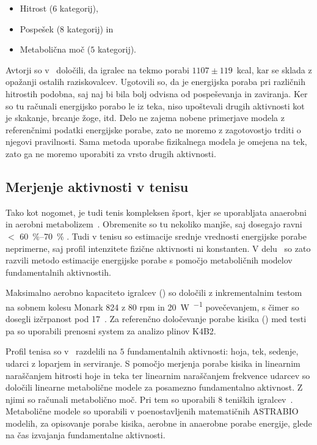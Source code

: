 \begin{itemize}
\item Hitrost ($6$ kategorij),
\item Pospešek ($8$ kategorij) in
\item Metabolična moč ($5$ kategorij).
\end{itemize}

Avtorji so v~\cite{osgnach2010energy} določili, da igralec na tekmo porabi $1107 \pm 119$~kcal, kar se sklada z opažanji ostalih raziskovalcev. Ugotovili so, da je energijska poraba pri različnih hitrostih podobna, saj naj bi bila bolj odvisna od pospeševanja in zaviranja. Ker so tu računali energijsko porabo le iz teka, niso upoštevali drugih aktivnosti kot je skakanje, brcanje žoge, itd. Delo ne zajema nobene primerjave modela z referenčnimi podatki energijske porabe, zato ne moremo z zagotovostjo trditi o njegovi pravilnosti. Sama metoda uporabe fizikalnega modela je omejena na tek, zato ga ne moremo uporabiti za vrsto drugih aktivnosti.





\subsection{Merjenje aktivnosti v tenisu}

Tako kot nogomet, je tudi tenis kompleksen šport, kjer se uporabljata anaerobni in aerobni metabolizem~\cite{botton2011energy}. Obremenite so tu nekoliko manjše, saj dosegajo ravni $<$ \SI{60}{\%}--\SI{70}{\%} \vomax. Tudi v tenisu so estimacije srednje vrednosti energijske porabe neprimerne, saj profil intenzitete fizične aktivnosti ni konstanten. V delu~\cite{botton2011energy} so zato razvili metodo estimacije energijske porabe s pomočjo metaboličnih modelov fundamentalnih aktivnostih. 

Maksimalno aerobno kapaciteto igralcev (\vomax) so določili z inkrementalnim testom na sobnem kolesu Monark 824 z 80 rpm in \SI{20}{W.\min^{-1}} povečevanjem, s čimer so dosegli izčrpanost pod \SI{17}{\min}~\cite{botton2011energy}. Za referenčno določevanje porabe kisika (\vo) med testi pa so uporabili prenosni system za analizo plinov K4B2. 

Profil tenisa  so v~\cite{botton2011energy} razdelili na $5$ fundamentalnih aktivnosti: hoja, tek, sedenje, udarci z loparjem in serviranje. S pomočjo merjenja porabe kisika in linearnim naraščanjem hitrosti hoje in teka ter linearnim naraščanjem frekvence udarcev so določili linearne metabolične modele za posamezno fundamentalno aktivnost. Z njimi so računali metabolično moč. Pri tem so uporabili $8$ teniških igralcev~\cite{botton2011energy}. Metabolične modele so uporabili v poenostavljenih matematičnih ASTRABIO modelih, za opisovanje porabe kisika, aerobne in anaerobne porabe energije, glede na čas izvajanja fundamentalne aktivnosti. 

